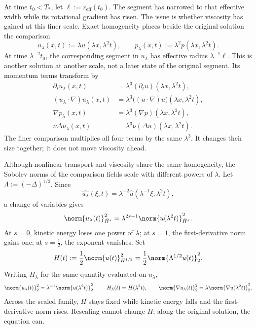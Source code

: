 
At time \(t_0<T_*\), let \(\ell:=r_{\mathrm{eff}}(t_0)\). The segment has narrowed to that effective width while its rotational gradient has risen. The issue is whether viscosity has gained at this finer scale. Exact \NavierStokes{} homogeneity places beside the original solution the comparison
\[
  u_\lambda(x,t)
  :=
  \lambda u(\lambda x,\lambda^2t),
  \qquad
  p_\lambda(x,t)
  :=
  \lambda^2p(\lambda x,\lambda^2t).
\]
At time \(\lambda^{-2}t_0\), the corresponding segment in \(u_\lambda\) has effective radius \(\lambda^{-1}\ell\). This is another solution at another scale, not a later state of the original segment. Its momentum terms transform by
\[
\begin{aligned}
  \partial_tu_\lambda(x,t)
  &=
  \lambda^3(\partial_tu)(\lambda x,\lambda^2t),
  \\
  (u_\lambda\cdot\nabla)u_\lambda(x,t)
  &=
  \lambda^3\bigl((u\cdot\nabla)u\bigr)(\lambda x,\lambda^2t),
  \\
  \nabla p_\lambda(x,t)
  &=
  \lambda^3(\nabla p)(\lambda x,\lambda^2t),
  \\
  \nu\Delta u_\lambda(x,t)
  &=
  \lambda^3\nu(\Delta u)(\lambda x,\lambda^2t).
\end{aligned}
\]
The finer comparison multiplies all four terms by the same \(\lambda^3\). It changes their size together; it does not move viscosity ahead.


Although nonlinear transport and viscosity share the same homogeneity, the Sobolev norms of the comparison fields scale with different powers of \(\lambda\). Let \(\Lambda:=(-\Delta)^{1/2}\). Since
\[
  \widehat{u_\lambda}(\xi,t)
  =
  \lambda^{-2}\widehat u(\lambda^{-1}\xi,\lambda^2t),
\]
a change of variables gives
\[
  \norm{u_\lambda(t)}_{\dot H^s}^2
  =
  \lambda^{2s-1}
  \norm{u(\lambda^2t)}_{\dot H^s}^2.
\]
At \(s=0\), kinetic energy loses one power of \(\lambda\); at \(s=1\), the first-derivative norm gains one; at \(s=\tfrac12\), the exponent vanishes. Set
\[
  H(t)
  :=
  \frac12\norm{u(t)}_{\dot H^{1/2}}^2
  =
  \frac12\norm{\Lambda^{1/2}u(t)}_2^2.
\]
Writing \(H_\lambda\) for the same quantity evaluated on \(u_\lambda\),
\[
  \norm{u_\lambda(t)}_2^2
  =
  \lambda^{-1}\norm{u(\lambda^2t)}_2^2,
  \qquad
  H_\lambda(t)=H(\lambda^2t),
  \qquad
  \norm{\nabla u_\lambda(t)}_2^2
  =
  \lambda\norm{\nabla u(\lambda^2t)}_2^2.
\]
Across the scaled family, \(H\) stays fixed while kinetic energy falls and the first-derivative norm rises. Rescaling cannot change \(H\); along the original solution, the equation can.


